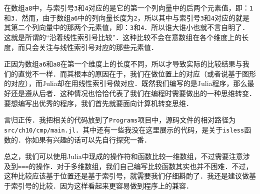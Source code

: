 在数组\verb|a8|中，与索引号\verb|3|和\verb|4|对应的是它的第一个列向量中的后两个元素值，即：\verb|1|和\verb|3|．然而，由于数组\verb|a6|中的列向量长度为\verb|2|，所以其中与索引号\verb|3|和\verb|4|对应的就是其第二个列向量中的那两个元素值，即：\verb|3|和\verb|4|．所以谁大谁小也就不言自明了．这就是所谓的“沿着线性索引号比较”．这种比较不会在意数组在各个维度上的长度，而只会关注与线性索引号对应的那些元素值．

正因为数组\verb|a6|和\verb|a8|在第一个维度上的长度不同，所以才导致实际的比较结果与我们的直觉不一样．而其根本的原因在于，我们在做位置上的对应（或者说基于图形的对应），而Julia却在用线性索引号做对应．既然我们编写的是Julia程序，那么最好还是遵从后者．这种情况也恰恰代表了我们在编程时需要做出的一种思维转变．要想编写出优秀的程序，我们首先就要面向计算机转变思维．

言归正传．我把相关的代码放到了\verb|Programs|项目中，源码文件的相对路径为\verb|src/ch10/cmp/main.jl|．其中还有一些我没在这里展示的代码，是关于\verb|isless|函数的．你如果有兴趣的话可以先自行探究一番．

总之，我们可以使用Julia中现成的操作符和函数比较一维数组，不过需要注意涉及到\verb|===|的操作．对于多维数组，我们自己编写比较函数其实也并不困难．不过，这种比较应该基于位置还是基于索引号，就需要我们仔细斟酌了．我还是建议做基于索引号的比较．因为这样看起来更容易做到程序上的兼容．